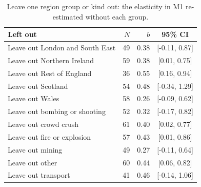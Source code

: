 \documentclass[11pt,a4paper]{article}
\begin{document}
\begin{table}[tbp]\centering\small\caption{Leave one region group or kind out: the elasticity in M1 re-estimated without each group.}\label{tab:loro}\begin{tabular}{lrrc}\toprule Left out & $N$ & $b$ & 95\% CI\\\midrule
Leave out London and South East & 49 & 0.38 & [-0.11, 0.87]\\
Leave out Northern Ireland & 59 & 0.38 & [0.01, 0.75]\\
Leave out Rest of England & 36 & 0.55 & [0.16, 0.94]\\
Leave out Scotland & 54 & 0.48 & [-0.34, 1.29]\\
Leave out Wales & 58 & 0.26 & [-0.09, 0.62]\\
Leave out bombing or shooting & 52 & 0.32 & [-0.17, 0.82]\\
Leave out crowd crush & 61 & 0.40 & [0.02, 0.77]\\
Leave out fire or explosion & 57 & 0.43 & [0.01, 0.86]\\
Leave out mining & 49 & 0.27 & [-0.11, 0.64]\\
Leave out other & 60 & 0.44 & [0.06, 0.82]\\
Leave out transport & 41 & 0.46 & [-0.14, 1.06]\\
\bottomrule\end{tabular}\end{table}
\end{document}
